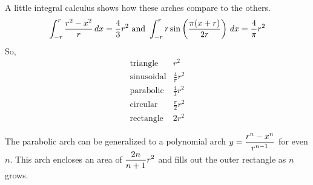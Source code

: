 A little integral calculus shows how these arches compare to the others.
\[
  \int_{-r}^r \frac{r^2-x^2}{r}\, dx = \frac{4}{3} r^2 \text{ and }
  \int_{-r}^r r \sin \left( \frac{\pi(x+r)}{2r} \right)\, dx = \frac{4}{\pi} r^2
\]
So,
\begin{eqnarray*}
\text{triangle} & r^2 \\
\text{sinusoidal} & \frac{4}{\pi} r^2 \\
\text{parabolic} & \frac{4}{3} r^2 \\
\text{circular} & \frac{\pi}{2} r^2 \\
\text{rectangle} & 2r^2
\end{eqnarray*}

The parabolic arch can be generalized to a polynomial arch $\displaystyle y = \frac{r^n-x^n}{r^{n-1}}$ for even $n$. This arch encloses an area of $\displaystyle \frac{2n}{n+1} r^2$ and fills out the outer rectangle as $n$ grows.


